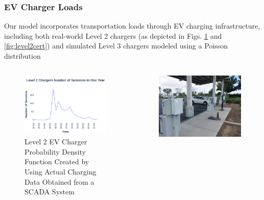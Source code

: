 \documentclass[aspectratio=169, 8 pt]{beamer}
\begin{document}
	\begin{frame}
		\frametitle{EV Charger Loads}
		Our model incorporates transportation loads through EV charging infrastructure, including both real-world Level 2 chargers (as depicted in Figs. \ref{fig:l2avgdayrandpoisson1hourpdf} and \ref{fig:level2cert}) and simulated Level 3 chargers modeled using a Poisson distribution
		\begin{columns}
			\begin{column}{0.5\linewidth}
				\begin{block}{}
					\begin{figure}
						\centering
						\includegraphics[width=0.9\linewidth]{Fig/Option_3/l2_avg_day_rand_poisson_1_hour_real.pdf}
						\caption{\footnotesize Level 2 EV Charger Probability Density Function  Created  by Using Actual Charging Data Obtained from a SCADA System}
						\label{fig:l2avgdayrandpoisson1hourpdf}
					\end{figure}
				\end{block}
			\end{column}
			\begin{column}{0.5\linewidth}
				\begin{block}{}
					\begin{figure}
						\centering
						\includegraphics[width=0.9\linewidth]{Fig/Option_3/level_2_cert}

\end{figure}
\end{block}
\end{column}
\end{columns}
\end{frame}
\end{document}
